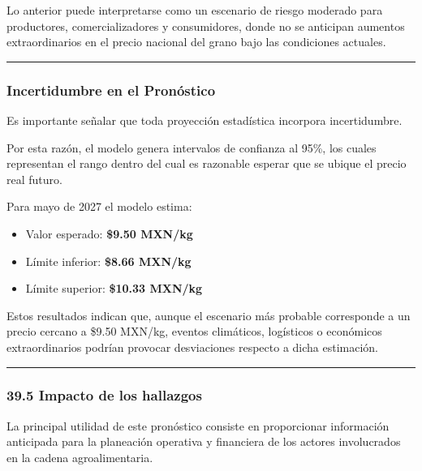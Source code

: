 \documentclass[11pt]{article}
\providecommand{\tightlist}{%
      \setlength{\itemsep}{0pt}\setlength{\parskip}{0pt}}
\begin{document}
Lo anterior puede interpretarse como un escenario de riesgo moderado
para productores, comercializadores y consumidores, donde no se
anticipan aumentos extraordinarios en el precio nacional del grano bajo
las condiciones actuales.

\begin{center}\rule{0.5\linewidth}{0.5pt}\end{center}

\hypertarget{incertidumbre-en-el-pronuxf3stico}{%
\subsubsection{Incertidumbre en el
Pronóstico}\label{incertidumbre-en-el-pronuxf3stico}}

Es importante señalar que toda proyección estadística incorpora
incertidumbre.

Por esta razón, el modelo genera intervalos de confianza al 95\%, los
cuales representan el rango dentro del cual es razonable esperar que se
ubique el precio real futuro.

Para mayo de 2027 el modelo estima:

\begin{itemize}
\tightlist
\item
  Valor esperado: \textbf{\$9.50 MXN/kg}
\item
  Límite inferior: \textbf{\$8.66 MXN/kg}
\item
  Límite superior: \textbf{\$10.33 MXN/kg}
\end{itemize}

Estos resultados indican que, aunque el escenario más probable
corresponde a un precio cercano a \$9.50 MXN/kg, eventos climáticos,
logísticos o económicos extraordinarios podrían provocar desviaciones
respecto a dicha estimación.

\begin{center}\rule{0.5\linewidth}{0.5pt}\end{center}

\hypertarget{impacto-de-los-hallazgos}{%
\subsubsection{39.5 Impacto de los
hallazgos}\label{impacto-de-los-hallazgos}}

La principal utilidad de este pronóstico consiste en proporcionar
información anticipada para la planeación operativa y financiera de los
actores involucrados en la cadena agroalimentaria.
\end{document}
